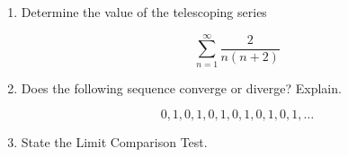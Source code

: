 \documentclass[12pt]{article}
\begin{document}
\begin{enumerate}
\item
Determine the value of the telescoping series

$$\sum_{n=1}^\infty \frac{2}{n(n+2)}$$

\vspace{2in}

\item

Does the following sequence converge or diverge?  Explain.

$$0,1,0,1,0,1,0,1,0,1,0,1,\dots$$

\vspace{2in}

\item

State the Limit Comparison Test.


\end{enumerate}
\end{document}
